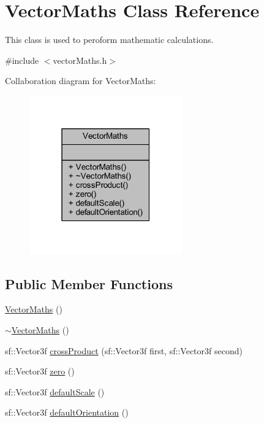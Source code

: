 \hypertarget{class_vector_maths}{}\section{Vector\+Maths Class Reference}
\label{class_vector_maths}


This class is used to peroform mathematic calculations.  




{\ttfamily \#include $<$vector\+Maths.\+h$>$}



Collaboration diagram for Vector\+Maths\+:\nopagebreak
\begin{figure}[H]
\begin{center}
\leavevmode
\includegraphics[width=187pt]{class_vector_maths__coll__graph}
\end{center}
\end{figure}
\subsection*{Public Member Functions}
\begin{DoxyCompactItemize}
\item 
\hyperlink{class_vector_maths_af14f2937b1a287972ae741082c63e6e2}{Vector\+Maths} ()
\item 
\hyperlink{class_vector_maths_ad8116f32c0c6a39a688303822f3c4611}{$\sim$\+Vector\+Maths} ()
\item 
sf\+::\+Vector3f \hyperlink{class_vector_maths_afd6cdceae635ef42bf7f638df65d284b}{cross\+Product} (sf\+::\+Vector3f first, sf\+::\+Vector3f second)
\item 
sf\+::\+Vector3f \hyperlink{class_vector_maths_a6ebf2d551c20c0aa08a1d36da3533b21}{zero} ()
\item 
sf\+::\+Vector3f \hyperlink{class_vector_maths_a9dd450c6e51df1eab7dd7824fb10155e}{default\+Scale} ()
\item 
sf\+::\+Vector3f \hyperlink{class_vector_maths_a9fd39cd1a0f66f19b88147cad85f9535}{default\+Orientation} ()
\end{DoxyCompactItemize}


